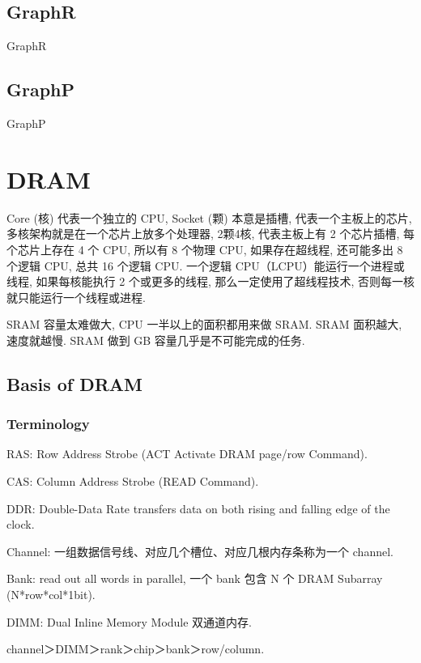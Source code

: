 \documentclass[UTF8,12pt,a4paper]{article}
\begin{document}
\subsection{GraphR}
GraphR~\cite{DBLP:conf/hpca/SongZQLC18}

\subsection{GraphP}
GraphP~\cite{DBLP:conf/hpca/ZhangZWGWCKQ18}

\clearpage

\section{DRAM}
Core (核) 代表一个独立的 CPU, Socket (颗) 本意是插槽,
代表一个主板上的芯片, 多核架构就是在一个芯片上放多个处理器,
2颗4核, 代表主板上有 2 个芯片插槽, 每个芯片上存在 4 个 CPU, 所以有 8 个物理 CPU,
如果存在超线程, 还可能多出 8 个逻辑 CPU, 总共 16 个逻辑 CPU.
一个逻辑 CPU（LCPU）能运行一个进程或线程, 如果每核能执行 2 个或更多的线程,
那么一定使用了超线程技术, 否则每一核就只能运行一个线程或进程.

SRAM 容量太难做大, CPU 一半以上的面积都用来做 SRAM.
SRAM 面积越大, 速度就越慢.
SRAM 做到 GB 容量几乎是不可能完成的任务.

\subsection{Basis of DRAM}
\subsubsection{Terminology}
\begin{compactitem}
  \item RAS: Row Address Strobe (ACT Activate DRAM page/row Command).
  \item CAS: Column Address Strobe (READ Command).
  \item DDR: Double-Data Rate transfers data
  on both rising and falling edge of the clock.
  \item Channel: 一组数据信号线、对应几个槽位、对应几根内存条称为一个 channel.
  \item Bank: read out all words in parallel, 一个 bank 包含 N 个 DRAM Subarray (N*row*col*1bit).
  \item DIMM: Dual Inline Memory Module 双通道内存.
  \item channel＞DIMM＞rank＞chip＞bank＞row/column.
\end{compactitem}
\end{document}
